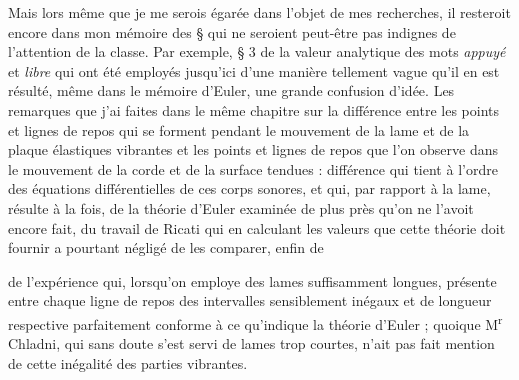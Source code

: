 \documentclass[11pt,a4paper]{article}
\begin{document}
Mais lors même que je me serois égarée dans l'objet  de mes recherches, il resteroit encore dans mon mémoire des § qui ne seroient peut-être pas indignes de l'attention de la classe. Par exemple,  § 3  de la valeur analytique des mots \emph{appuyé} et \emph{libre} qui ont été employés jusqu'ici d'une manière tellement vague qu'il en est résulté, même dans le mémoire d'Euler, une grande confusion d'idée. Les remarques que j'ai faites dans le même chapitre sur la différence entre les points et  lignes de repos qui se forment pendant le mouvement de la lame et de la plaque élastiques vibrantes et les points et lignes de repos que l'on observe dans le mouvement de la corde et de la surface tendues : différence qui tient à l'ordre des équations différentielles de ces corps sonores, et qui, par rapport à la lame, résulte à la fois, de la théorie d'Euler examinée de plus près qu'on ne l'avoit encore fait, du travail de Ricati qui en calculant les valeurs que cette théorie doit fournir a pourtant négligé de les comparer, enfin de


de l'expérience qui, lorsqu'on employe des lames suffisamment longues, présente entre chaque ligne de repos des intervalles sensiblement inégaux et de longueur respective parfaitement conforme à ce qu'indique la théorie d'Euler ; quoique M\textsuperscript{r} Chladni, qui sans doute s'est  servi de lames trop courtes, n'ait pas fait mention de cette inégalité des parties vibrantes.
\end{document}
